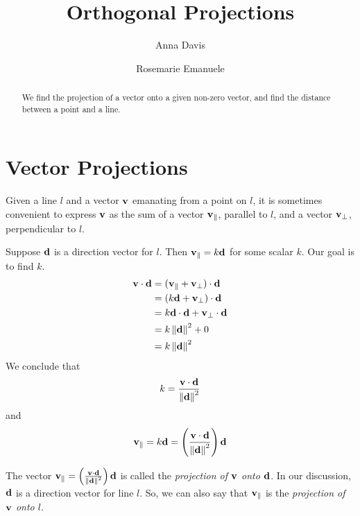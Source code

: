 \documentclass{ximera}
\author{Anna Davis \and Rosemarie Emanuele} \title{Orthogonal Projections} \license{CC-BY 4.0}
\renewcommand{\vec}[1]{{\bf #1}}
\newcommand{\dfn}{\textit}
\newcommand{\dotp}{\cdot}
\newcommand{\norm}[1]{\left\lVert#1\right\rVert}
\begin{document}
\begin{abstract}
 We find the projection of a vector onto a given non-zero vector, and find the distance between a point and a line.
\end{abstract}
\maketitle

\section*{Vector Projections}

Given a line $l$ and a vector $\vec{v}$ emanating from a point on $l$, it is sometimes convenient to express $\vec{v}$ as the sum of a vector $\vec{v}_{\parallel}$, parallel to $l$, and a vector $\vec{v}_{\perp}$, perpendicular to $l$.

\begin{image}[2in]

\end{image}

Suppose $\vec{d}$ is a direction vector for $l$.  Then $\vec{v}_
{\parallel}=k\vec{d}$ for some scalar $k$.  Our goal is to find $k$.  
\begin{align*}\vec{v}\dotp\vec{d}&=(\vec{v}_{\parallel}+\vec{v}_{\perp})\dotp\vec{d}\\
&=(k\vec{d}+\vec{v}_{\perp})\dotp\vec{d}\\
&=k\vec{d}\dotp\vec{d}+\vec{v}_{\perp}\dotp\vec{d}\\
&=k\norm{\vec{d}}^2+0\\
&=k\norm{\vec{d}}^2
\end{align*}
We conclude that $$k=\frac{\vec{v}\dotp\vec{d}}{\norm{\vec{d}}^2}$$
and $$\vec{v}_{\parallel}=k\vec{d}=\left(\frac{\vec{v}\dotp\vec{d}}{\norm{\vec{d}}^2}\right)\vec{d}$$

The vector $\vec{v}_{\parallel}=\left(\frac{\vec{v}\dotp\vec{d}}{\norm{\vec{d}}^2}\right)\vec{d}$ is called the \dfn{projection of $\vec{v}$ onto $\vec{d}$}.  In our discussion, $\vec{d}$ is a direction vector for line $l$.  So, we can also say that $\vec{v}_{\parallel}$ is the \dfn{projection of $\vec{v}$ onto $l$}.
\end{document}
